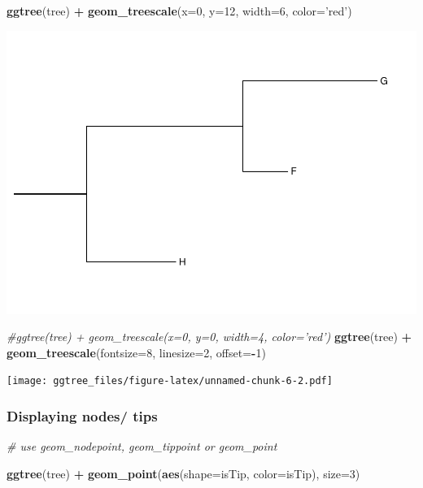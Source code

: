 \documentclass[]{article}
\newenvironment{Shaded}{\begin{snugshade}}{\end{snugshade}}
\newcommand{\KeywordTok}[1]{\textcolor[rgb]{0.13,0.29,0.53}{\textbf{#1}}}
\newcommand{\DataTypeTok}[1]{\textcolor[rgb]{0.13,0.29,0.53}{#1}}
\newcommand{\DecValTok}[1]{\textcolor[rgb]{0.00,0.00,0.81}{#1}}
\newcommand{\StringTok}[1]{\textcolor[rgb]{0.31,0.60,0.02}{#1}}
\newcommand{\CommentTok}[1]{\textcolor[rgb]{0.56,0.35,0.01}{\textit{#1}}}
\newcommand{\OperatorTok}[1]{\textcolor[rgb]{0.81,0.36,0.00}{\textbf{#1}}}
\newcommand{\NormalTok}[1]{#1}
\begin{document}
\begin{Shaded}
\begin{Highlighting}[]
\KeywordTok{ggtree}\NormalTok{(tree) }\OperatorTok{+}\StringTok{ }\KeywordTok{geom_treescale}\NormalTok{(}\DataTypeTok{x=}\DecValTok{0}\NormalTok{, }\DataTypeTok{y=}\DecValTok{12}\NormalTok{, }\DataTypeTok{width=}\DecValTok{6}\NormalTok{, }\DataTypeTok{color=}\StringTok{'red'}\NormalTok{)}
\end{Highlighting}
\end{Shaded}

\includegraphics{ggtree_files/figure-latex/unnamed-chunk-6-1.pdf}

\begin{Shaded}
\begin{Highlighting}[]
\CommentTok{#ggtree(tree) + geom_treescale(x=0, y=0, width=4, color='red')}
\KeywordTok{ggtree}\NormalTok{(tree) }\OperatorTok{+}\StringTok{ }\KeywordTok{geom_treescale}\NormalTok{(}\DataTypeTok{fontsize=}\DecValTok{8}\NormalTok{, }\DataTypeTok{linesize=}\DecValTok{2}\NormalTok{, }\DataTypeTok{offset=}\OperatorTok{-}\DecValTok{1}\NormalTok{)}
\end{Highlighting}
\end{Shaded}

\texttt{[image: ggtree\_files/figure-latex/unnamed-chunk-6-2.pdf]}

\subsubsection{Displaying nodes/ tips}\label{displaying-nodes-tips}

\begin{Shaded}
\begin{Highlighting}[]
\CommentTok{# use geom_nodepoint, geom_tippoint or geom_point}

\KeywordTok{ggtree}\NormalTok{(tree) }\OperatorTok{+}\StringTok{ }\KeywordTok{geom_point}\NormalTok{(}\KeywordTok{aes}\NormalTok{(}\DataTypeTok{shape=}\NormalTok{isTip, }\DataTypeTok{color=}\NormalTok{isTip), }\DataTypeTok{size=}\DecValTok{3}\NormalTok{)}
\end{Highlighting}
\end{Shaded}
\end{document}
